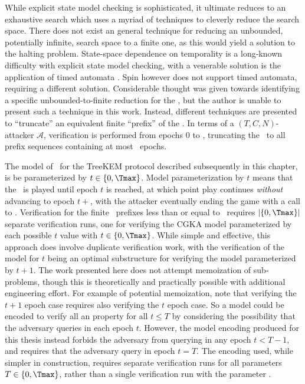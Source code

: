 While explicit state model checking is sophisticated, it ultimate reduces to an exhaustive search which uses a myriad of techniques to cleverly reduce the search space.
There does not exist an general technique for reducing an unbounded, potentially infinite, search space to a finite one, as this would yield a solution to the halting problem.
State-space dependence on temporality is a long-known difficulty with explicit state model checking, with a venerable solution is the application of timed automata \autocite{alur1994theory}.
Spin however does not support timed automata, requiring a different solution.
Considerable thought was given towards identifying a specific unbounded-to-finite reduction for the \CGKAsec, but the author is unable to present such a technique in this work.
Instead, different techniques are presented to ``truncate'' an equivalent finite ``prefix'' of the \CGKAsec.
In terms of a \((T, C, N)\)-attacker \(\mathcal{A}\), verification is performed from epochs $0$ to \Tmax, truncating the \CGKAsec\ to all prefix sequences containing at most \Tmax\ epochs.

The model of \CGKAsec\ for the TreeKEM protocol described subsequently in this chapter, is be parameterized by $t \in \{ 0, \Tmax \}$.
Model parameterization by $t$ means that the \CGKAsec\ is played until epoch $t$ is reached, at which point play continues \emph{without} advancing to epoch $t+$, with the attacker eventually ending the game with a call to .
Verification for the finite \CGKAsec\ prefixes less than or equal to \Tmax\ requires $|\{ 0, \Tmax \}|$ separate verification runs, one for verifying the CGKA model parameterized by each possible $t$ value with $t \in \{ 0, \Tmax \}$.
While simple and effective, this approach does involve duplicate verification work, with the verification of the model for $t$ being an optimal substructure for verifying the model parameterized by $t+1$.
The work presented here does not attempt memoization of sub-problems, though this is theoretically and practically possible with additional engineering effort.
For example of potential memoization, note that verifying the \(t+1\) epoch case requires also verifying the \(t\) epoch case.
So a model  could be encoded to verify all an  property for all \(t \le T\) by considering the possibility that the adversary queries  in each epoch \(t\).
However, the model encoding produced for this thesis instead forbids the adversary from querying  in any epoch \(t < T - 1 \), and requires that the adversary query  in epoch \(t = T\).
The encoding used, while simpler in construction, requires separate verification runs for all parameters \(T \in \{ 0, \Tmax \}\), rather than a single verification run with the parameter \Tmax.


